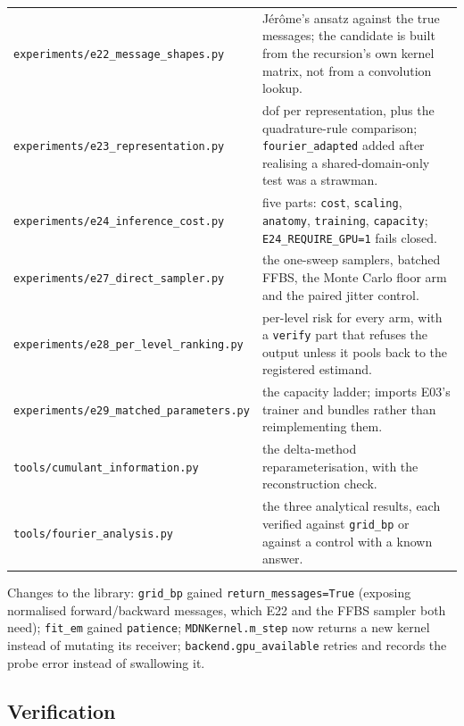 \documentclass[10pt,a4paper]{article}
\newcommand{\code}[1]{\texttt{\small #1}}
\begin{document}
\noindent\begin{tabular}{@{}l p{10.6cm}@{}}
\toprule
\code{experiments/e22\_message\_shapes.py} & Jérôme's ansatz against the true messages; the
candidate is built from the recursion's own kernel matrix, not from a convolution lookup. \\
\code{experiments/e23\_representation.py} & dof per representation, plus the quadrature-rule
comparison; \code{fourier\_adapted} added after realising a shared-domain-only test was a
strawman. \\
\code{experiments/e24\_inference\_cost.py} & five parts: \code{cost}, \code{scaling},
\code{anatomy}, \code{training}, \code{capacity}; \code{E24\_REQUIRE\_GPU=1} fails closed. \\
\code{experiments/e27\_direct\_sampler.py} & the one-sweep samplers, batched FFBS, the Monte
Carlo floor arm and the paired jitter control. \\
\code{experiments/e28\_per\_level\_ranking.py} & per-level risk for every arm, with a
\code{verify} part that refuses the output unless it pools back to the registered estimand. \\
\code{experiments/e29\_matched\_parameters.py} & the capacity ladder; imports E03's trainer and
bundles rather than reimplementing them. \\
\code{tools/cumulant\_information.py} & the delta-method reparameterisation, with the
reconstruction check. \\
\code{tools/fourier\_analysis.py} & the three analytical results, each verified against
\code{grid\_bp} or against a control with a known answer. \\
\bottomrule
\end{tabular}

\medskip
Changes to the library: \code{grid\_bp} gained \code{return\_messages=True} (exposing normalised
forward/backward messages, which E22 and the FFBS sampler both need); \code{fit\_em} gained
\code{patience}; \code{MDNKernel.m\_step} now returns a new kernel instead of mutating its
receiver; \code{backend.gpu\_available} retries and records the probe error instead of
swallowing it.

\subsection{Verification}
\end{document}
